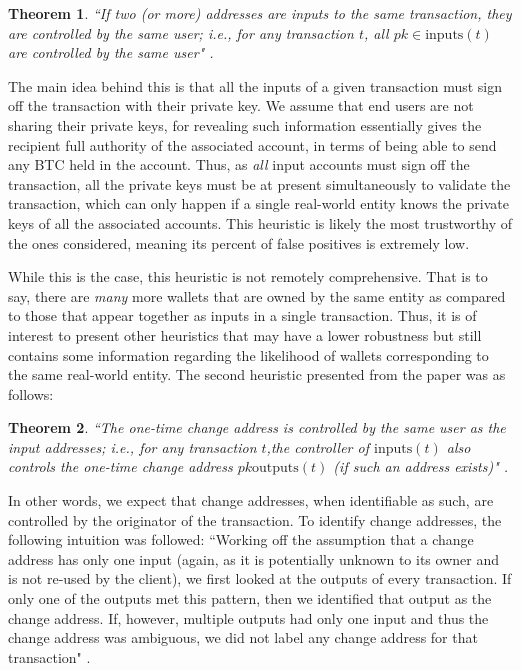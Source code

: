 \documentclass{article}
\newtheorem{theorem}{Theorem}[section]
\begin{document}
\begin{theorem}
``If two (or more) addresses are inputs to the same transaction, they are controlled by the same user; i.e., for any transaction $t$, all $pk\in\text{inputs}(t)$  are controlled by the same user" \cite{fistful}.
\end{theorem}

The main idea behind this is that all the inputs of a given transaction must sign off the transaction with their private key. We assume that end users are not sharing their private keys, for revealing such information essentially gives the recipient full authority of the associated account, in terms of being able to send any BTC held in the account. Thus, as \textit{all} input accounts must sign off the transaction, all the private keys must be at present simultaneously to validate the transaction, which can only happen if a single real-world entity knows the private keys of all the associated accounts. This heuristic is likely the most trustworthy of the ones considered, meaning its percent of false positives is extremely low. 

While this is the case, this heuristic is not remotely comprehensive. That is to say, there are \textit{many} more wallets that are owned by the same entity as compared to those that appear together as inputs in a single transaction. Thus, it is of interest to present other heuristics that may have a lower robustness but still contains some information regarding the likelihood of wallets corresponding to the same real-world entity. The second heuristic presented from the paper was as follows:

\begin{theorem}
``The  one-time  change  address  is  controlled  by the same user as the input addresses; i.e., for any transaction $t$,the controller of $\text{inputs}(t)$ also controls the one-time change address $pk \text{outputs}(t)$ (if such an address exists)" \cite{fistful}.
\end{theorem}

In other words, we expect that change addresses, when identifiable as such, are controlled by the originator of the transaction. To identify change addresses, the following intuition was followed: ``Working off the assumption that a change address has only one input (again,  as it is potentially unknown to its owner and is not re-used by the client), we first looked at the outputs of every transaction. If only one of the outputs met this pattern, then we identified that output as the change address. If, however, multiple outputs had only one input and thus the change address was ambiguous, we did not label any change address for that transaction" \cite{fistful}.
\end{document}
